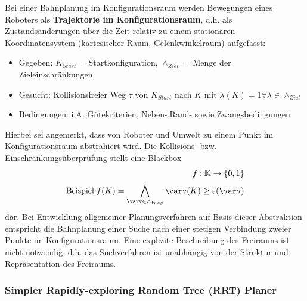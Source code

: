 Bei einer Bahnplanung im Konfigurationsraum werden Bewegungen eines Roboters als \textbf{Trajektorie im Konfigurationsraum}, d.h. als Zustandsänderungen über die Zeit
relativ zu einem stationären Koordinatensystem (kartesischer Raum, Gelenkwinkelraum) aufgefasst:
\begin{itemize}
\item Gegeben: $K_{Start}$ = Startkonfiguration, $\land_{Ziel}$ = Menge der Zieleinschränkungen
\item Gesucht: Kollisionsfreier Weg $\tau$ von $K_{Start}$ nach $K$ mit $\lambda(K)=1 \forall \lambda \in \land_{Ziel}$
\item Bedingungen: i.A. Gütekriterien, Neben-,Rand- sowie Zwangsbedingungen
\end{itemize}
Hierbei sei angemerkt, dass von Roboter und Umwelt zu einem Punkt im Konfigurationsraum abstrahiert wird. Die Kollisions- bzw. Einschränkungsüberprüfung stellt eine Blackbox
\begin{align*}
f: \mathbb{K} \rightarrow \{0, 1\}\\
\text{Beispiel:} f(K) = \bigwedge\limits_{\varv \in \land_{Weg}}^{} \varv(K) \geq \varepsilon(\varv)
\end{align*}
dar. Bei Entwicklung allgemeiner Planungsverfahren auf Basis dieser Abstraktion entspricht die Bahnplanung einer Suche nach einer stetigen Verbindung zweier Punkte im
Konfigurationsraum. Eine explizite Beschreibung des Freiraums ist nicht notwendig, d.h. das Suchverfahren ist unabhängig von der Struktur und Repräsentation des Freiraums.

\subsubsection*{Simpler Rapidly-exploring Random Tree (RRT) Planer}
